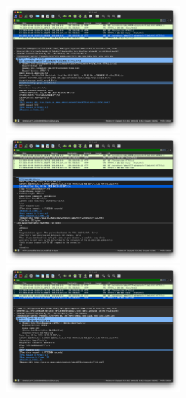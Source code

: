 \documentclass{article}
\begin{document}
\includegraphics[width=0.5\textwidth]{lab2_part2_get2}\\
\includegraphics[width=0.5\textwidth]{lab2_part2_response1}
\includegraphics[width=0.5\textwidth]{lab2_part2_response2}
\end{document}
